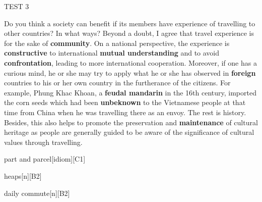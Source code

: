 \begin{glossarymc}[Cambridge 9]
\begin{test}{TEST 3}
    \begin{qa}{Do you think a society can benefit if its members have experience of travelling to other countries? In what ways?}
    Beyond a doubt, I agree that travel experience is for the sake of \textbf{community}. On a national perspective, the experience is \textbf{constructive} to international \textbf{mutual understanding} and to avoid \textbf{confrontation}, leading to more international cooperation. Moreover, if one has a curious mind, he or she may try to apply what he or she has observed in \textbf{foreign} countries to his or her own country in the furtherance of the citizens. For example, Phung Khac Khoan, a \textbf{feudal mandarin} in the 16th century, imported the corn seeds which had been \textbf{unbeknown} to the Vietnamese people at that time from China when he was travelling there as an envoy. The rest is history. Besides, this also helps to promote the preservation and \textbf{maintenance} of cultural heritage as people are generally guided to be aware of the significance of cultural values through travelling.
    \end{qa}

        \begin{VocabExplain}[Part 3]
            \begin{ExplainCard}{part and parcel}[idiom][C1]
            \end{ExplainCard}

            \begin{ExplainCard}{heaps}[n][B2]
            \end{ExplainCard}

            \begin{ExplainCard}{daily commute}[n][B2]
            \end{ExplainCard}


\end{VocabExplain}
\end{test}
\end{glossarymc}
